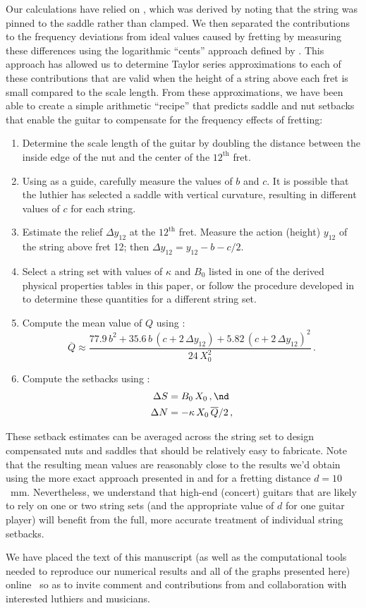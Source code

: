 Our calculations have relied on , which was derived by noting that the string was pinned to the saddle rather than clamped. We then separated the contributions to the frequency deviations from ideal values caused by fretting by measuring these differences using the logarithmic ``cents'' approach defined by . This approach has allowed us to determine Taylor series approximations to each of these contributions that are valid when the height of a string above each fret is small compared to the scale length. From these approximations, we have been able to create a simple arithmetic ``recipe'' that predicts saddle and nut setbacks that enable the guitar to compensate for the frequency effects  of fretting:
\begin{enumerate}
    \item Determine the scale length of the guitar by doubling the distance between the inside edge of the nut and the center of the $12^\textrm{th}$ fret. 
    \item Using  as a guide, carefully measure the values of $b$ and $c$. It is possible that the luthier has selected a saddle with vertical curvature, resulting in different values of $c$ for each string.
    \item Estimate the relief $\Delta y_{12}$ at the $12^\textrm{th}$ fret. Measure the action (height) $y_{12}$ of the string above fret 12; then $\Delta y_{12} = y_{12} - b - c/2$.
    \item Select a string set with values of $\kappa$ and $B_0$ listed in one of the derived physical properties tables in this paper, or follow the procedure developed in  to determine these quantities for a different string set.
    \item Compute the mean value of $Q$ using :
    \begin{equation*}
        \overline{Q} \approx \frac{77.9\, b^2 + 35.6\, b\, \left(c + 2\, \Delta y_{12}\right) + 5.82\, \left(c + 2\, \Delta y_{12}\right)^2}{24\, X_0^2}\, .
    \end{equation*}
    \item Compute the setbacks using :
    \begin{align*}
        \Delta S &= B_0\, X_0\, , \nd \\
        \Delta N &= - \kappa\, X_0\, \overline{Q} / 2\, ,
    \end{align*}
\end{enumerate}
These setback estimates can be averaged across the string set to design compensated nuts and saddles that should be relatively easy to fabricate. Note that the resulting mean values are reasonably close to the results we'd obtain using the more exact approach presented in  and  for a fretting distance $d = 10$~mm. Nevertheless, we understand that high-end (concert) guitars that are likely to rely on one or two string sets (and the appropriate value of $d$ for one guitar player) will benefit from the full, more accurate treatment of individual string setbacks.

We have placed the text of this manuscript (as well as the computational tools needed to reproduce our numerical results and all of the graphs presented here) online~\cite{ref:github2021rgb} so as to invite comment and contributions from and collaboration with interested luthiers and musicians.